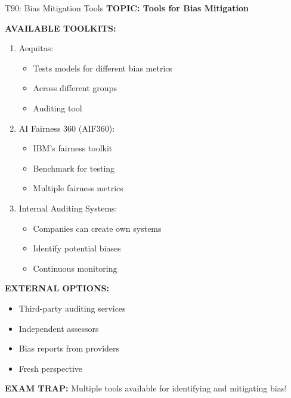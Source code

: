 \documentclass[8pt]{beamer}
\begin{document}
	\begin{frame}{T90: Bias Mitigation Tools}
		\fontsize{6.5}{7.5}\selectfont
		\textbf{TOPIC: Tools for Bias Mitigation}
		
		\vspace{0.1cm}
		\textbf{AVAILABLE TOOLKITS:}
		\begin{enumerate}
			\item \textcolor{myblue}{Aequitas:}
			\begin{itemize}
				\item Tests models for different bias metrics
				\item Across different groups
				\item Auditing tool
			\end{itemize}
			\item \textcolor{myblue}{AI Fairness 360 (AIF360):}
			\begin{itemize}
				\item IBM's fairness toolkit
				\item Benchmark for testing
				\item Multiple fairness metrics
			\end{itemize}
			\item \textcolor{myblue}{Internal Auditing Systems:}
			\begin{itemize}
				\item Companies can create own systems
				\item Identify potential biases
				\item Continuous monitoring
			\end{itemize}
		\end{enumerate}
		
		\vspace{0.1cm}
		\textbf{EXTERNAL OPTIONS:}
		\begin{itemize}
			\item Third-party auditing services
			\item Independent assessors
			\item Bias reports from providers
			\item Fresh perspective
		\end{itemize}
		
		\textcolor{myred}{\textbf{EXAM TRAP:}} Multiple tools available for \textcolor{myblue}{identifying and mitigating bias}!
	\end{frame}
	
\end{document}
